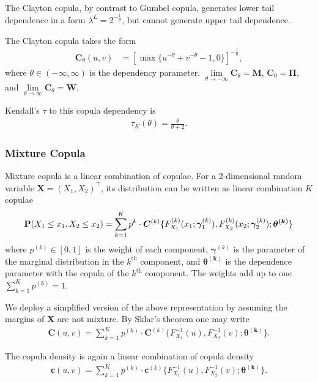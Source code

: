 The Clayton copula, by contrast to Gumbel copula,
generates lower tail dependence in a form $\lambda^L = 2^{-\frac{1}{\theta}}$,
but cannot generate upper tail dependence.\medskip

The Clayton copula takes the form
\begin{align}
    \bm{C}_{\theta}(u,v) &= \left[
    \max\{u^{-\theta}+v^{-\theta}-1,0\}\right]^{-\frac{1}{\theta}},
    \end{align}
where $\theta \in (-\infty, \infty)$ is the dependency parameter.
$\lim\limits_{\theta \to -\infty} \bm{C}_\theta = \bm{M}$, $\bm{C}_0 = \bm{\Pi}$, and $\lim\limits_{\theta \to \infty} \bm{C}_\theta = \bm{W}$.\medskip

Kendall's $\tau$ to this copula dependency is 
\begin{align}
    \tau_K(\theta) =\frac{\theta}{\theta+2}.
    \end{align}\medskip


\subsubsection{Mixture Copula}\label{sec:mixture-copula}
Mixture copula is a linear combination of copulae. 
For a 2-dimensional random variable $\bm{X}=(X_1,X_2)^\top$,
its distribution can be written as linear combination $K$ copulae
\begin{align}
    {\bf P}(X_1 \leq x_1, X_2 \leq x_2) = \sum_{k=1}^K p^k \cdot \bm{C}^{(k)}\{F^{(k)}_{X_1}(x_1;\bm{\gamma}^{(k)}_1),
    F^{(k)}_{X_2}(x_2;\bm{\gamma}^{(k)}_2); \bm{\theta^{(k)}}\}
    \end{align}
where $p^{(k)} \in [0,1]$ is the weight of each component,
$\bm{\gamma}^{(k)}$ is the parameter of the marginal distribution in the $k^\text{th}$ component,
and $\bm{\theta^{(k)}}$ is the dependence parameter with the copula of the $k^\text{th}$ component.
The weights add up to one $\sum_{k=1}^K p^{(k)}=1$. \medskip

We deploy a simplified version of the above representation by assuming the margins of $\bm{X}$ are not mixture.
By Sklar's theorem one may write
\begin{align}
    \bm{C}(u,v)= \sum_{k=1}^K p^{(k)} \cdot \bm{C}^{(k)}\{F^{-1}_{X_1}(u),
    F^{-1}_{X_2}(v); \bm{\theta^{(k)}}\}.
    \end{align}\medskip

The copula density is again a linear combination of copula density
\begin{align}
    \bm{c}(u,v)= \sum_{k=1}^K p^{(k)} \cdot \bm{c}^{(k)}\{F^{-1}_{X_1}(u),
    F^{-1}_{X_2}(v); \bm{\theta^{(k)}}\}.
    \end{align}\medskip

